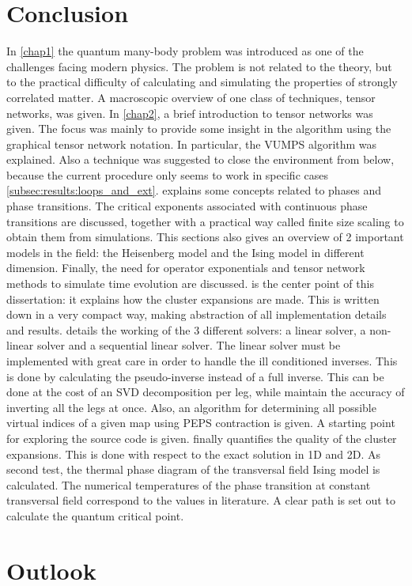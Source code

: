 \section{Conclusion}

In \cref{chap1} the quantum many-body problem was introduced as one of the challenges facing modern physics. The problem is not related to the theory, but to the practical difficulty of calculating and simulating the properties of strongly correlated matter. A macroscopic overview of one class of techniques, tensor networks, was given.
In \cref{chap2}, a brief introduction to tensor networks was given. The focus was mainly to provide some insight in the algorithm using the graphical tensor network notation. In particular, the VUMPS algorithm was explained. Also a technique was suggested to close the environment from below, because the current procedure only seems to work in specific cases \cref{subsec:results:loops_and_ext}.
 explains some concepts related to phases and phase transitions. The critical exponents associated with continuous phase transitions are discussed, together with a practical way called finite size scaling to obtain them from simulations. This sections also gives an overview of 2 important models in the field: the Heisenberg model and the Ising model in different dimension. Finally, the need for operator exponentials and tensor network methods to simulate time evolution are discussed.
 is the center point of this dissertation: it explains how the cluster expansions are made. This is written down in a very compact way, making abstraction of all implementation details and results.
 details the working of the 3 different solvers: a linear solver, a non-linear solver and a sequential linear solver. The linear solver must be implemented with great care in order to handle the ill conditioned inverses. This is done by calculating the pseudo-inverse instead of a full inverse. This can be done at the cost of an SVD decomposition per leg, while maintain the accuracy of inverting all the legs at once. Also, an algorithm for determining all possible virtual indices of a given map using PEPS contraction is given.  A starting point for exploring the source code is given.
 finally quantifies the quality of the cluster expansions. This is done with respect to the exact solution in 1D and 2D. As second test, the thermal phase diagram of the transversal field Ising model is calculated. The numerical temperatures of the phase transition at constant transversal field correspond to the values in literature. A clear path is set out to calculate the quantum critical point.

\section{Outlook}


